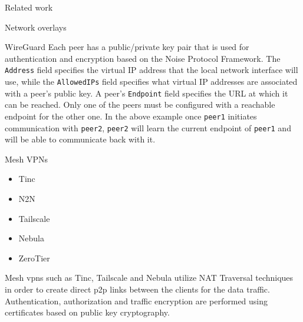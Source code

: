 \begin{frame}[fragile]{Related work}
\begin{block}{Network overlays}
\begin{block}{WireGuard}
Each peer has a public/private key pair that is used for authentication
and encryption based on the Noise Protocol
Framework\autocite{noiseDocs}. The \texttt{Address} field specifies the
virtual IP address that the local network interface will use, while the
\texttt{AllowedIPs} field specifies what virtual IP addresses are
associated with a peer's public key. A peer's \texttt{Endpoint} field
specifies the URL at which it can be reached. Only one of the peers must
be configured with a reachable endpoint for the other one. In the above
example once \texttt{peer1} initiates communication with \texttt{peer2},
\texttt{peer2} will learn the current endpoint of \texttt{peer1} and
will be able to communicate back with it.
\end{block}

\begin{block}{Mesh VPNs}
\protect\hypertarget{mesh-vpns}{}
\begin{itemize}
\tightlist
\item
  Tinc
\item
  N2N
\item
  Tailscale
\item
  Nebula
\item
  ZeroTier
\end{itemize}

Mesh \glspl{vpn} such as Tinc\autocite{tincDocs},
Tailscale\autocite{tailscaleDocs} and Nebula\autocite{nebulaDocs}
utilize NAT Traversal techniques in order to create direct \gls{p2p}
links between the clients for the data traffic. Authentication,
authorization and traffic encryption are performed using certificates
based on public key cryptography.


\end{block}
\end{block}
\end{frame}
